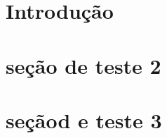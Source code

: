 \documentclass[12pt,a4paper]{article}
\author{Paulo Batista da Costa}
\title{}
\begin{document}
	\tableofcontents
	\newpage
	\section{Introdução} 
	\paragraph{}
	\section{seção de teste 2}
	\paragraph{}
	\section{seçãod e teste 3}
	\paragraph{}
	
\end{document}
